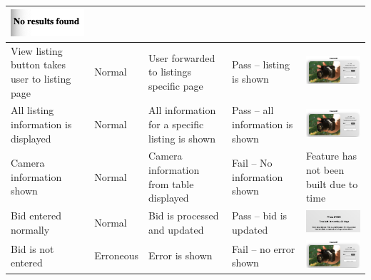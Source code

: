 \begin{center}
\begin{longtable}{|P{17mm}|P{17mm}|P{16mm}|P{17mm}|P{60mm}|}
\includegraphics[width=58mm]{ch3_developing/proto3/media/image27.png} \\ \hline
View listing button takes user to listing page & Normal & User forwarded
to listings specific page & Pass -- listing is shown &
\includegraphics[width=58mm]{ch3_developing/proto3/media/image28.png} \\ \hline
All listing information is displayed & Normal & All information for a
specific listing is shown & Pass -- all information is shown &
\includegraphics[width=58mm]{ch3_developing/proto3/media/image28.png} \\ \hline
Camera information shown & Normal & Camera information from table
displayed & Fail -- No information shown & Feature has not been built
due to time \\ \hline
Bid entered normally & Normal & Bid is processed and updated & Pass --
bid is updated &
\includegraphics[width=58mm]{ch3_developing/proto3/media/image29.png} \\ \hline
Bid is not entered & Erroneous & Error is shown & Fail -- no error shown
&
\includegraphics[width=58mm]{ch3_developing/proto3/media/image28.png} \\ \hline

\end{longtable}
\end{center}
